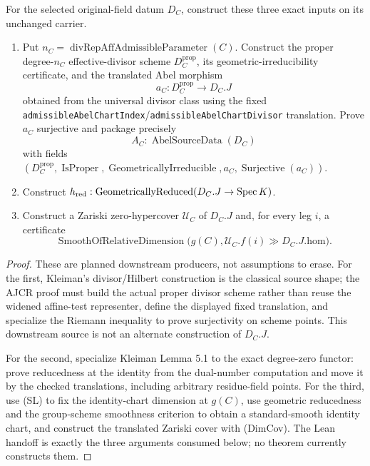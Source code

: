 \begin{theorem}
  \label{route-thm-phase8-geometry-producers}
  \notready

  For the selected original-field datum \(D_C\), construct these three exact
  inputs on its unchanged carrier.
  \begin{enumerate}
  \item Put \(n_C=\operatorname{divRepAffAdmissibleParameter}(C)\).  Construct
    the proper degree-\(n_C\) effective-divisor scheme
    \(D_C^{\mathrm{prop}}\), its geometric-irreducibility certificate, and the
    translated Abel morphism
    \[
      a_C:D_C^{\mathrm{prop}}\longrightarrow D_C.J
    \]
    obtained from the universal divisor class using the fixed
    \texttt{admissibleAbelChartIndex}/\texttt{admissibleAbelChartDivisor}
    translation.  Prove \(a_C\) surjective and package precisely
    \[
      A_C:\operatorname{AbelSourceData}(D_C)
    \]
    with fields \((D_C^{\mathrm{prop}},\operatorname{IsProper},
    \operatorname{GeometricallyIrreducible},a_C,
    \operatorname{Surjective}(a_C))\).
  \item Construct
    \(h_{\mathrm{red}}:
      \operatorname{GeometricallyReduced}(D_C.J\to\operatorname{Spec} K)\).
  \item Construct a Zariski zero-hypercover
    \(\mathcal U_C\) of \(D_C.J\) and, for every leg \(i\), a certificate
    \[
      \operatorname{SmoothOfRelativeDimension}
        \bigl(g(C),\mathcal U_C.f(i)\mathbin{\gg}D_C.J.\mathrm{hom}\bigr).
      \tag{DimCov}
    \]
  \end{enumerate}
\end{theorem}

\begin{proof}
  These are planned downstream producers, not assumptions to erase.  For the first,
  Kleiman's divisor/Hilbert construction is the classical source shape; the
  AJCR proof must build the actual proper divisor scheme rather than reuse the
  widened affine-test representer, define the displayed fixed translation, and
  specialize the Riemann inequality to prove surjectivity on scheme points.
  This downstream source is not an alternate construction of \(D_C.J\).

  For the second, specialize Kleiman Lemma 5.1 to the exact degree-zero functor:
  prove reducedness at the identity from the dual-number computation and move
  it by the checked translations, including arbitrary residue-field points.
  For the third, use (SL) to fix the identity-chart dimension at \(g(C)\), use
  geometric reducedness and the group-scheme smoothness criterion to obtain a
  standard-smooth identity chart, and construct the translated Zariski cover
  with (DimCov).  The Lean handoff is exactly the three arguments consumed
  below; no theorem currently constructs them.
\end{proof}

